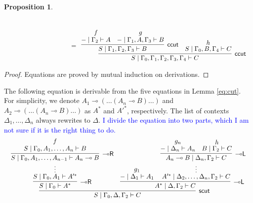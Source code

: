 \documentclass[sn-mathphys-num]{sn-jnl}%
\newcommand{\GG}{\Gamma}
\newcommand{\GD}{\Delta}
\newcommand{\vd}{\vdash}
\newcommand{\lolli}{\multimap}
\newcommand{\lleft}{{\lolli}\mathsf{L}}
\newcommand{\lright}{{\lolli}\mathsf{R}}
\newcommand{\mf}[1]{\mathsf{#1}}
\newcommand{\cheng}[1]{\textcolor{blue}{#1}}
\theoremstyle{thmstyleone}%
\newtheorem{proposition}[theorem]{Proposition}%
\theoremstyle{thmstyletwo}%
\theoremstyle{thmstylethree}%
\begin{document}
\begin{proposition}
\begin{displaymath}
\begin{array}{l}
      \\[10pt]
      \qquad \qquad \qquad \qquad \qquad  =
      \begin{array}{c}
        \infer[\mf{ccut}]{S \mid \GG_0 , \GG_1 , \GG_2 , \GG_3 , \GG_4 \vd C}{
          \infer[\mf{ccut}]{S \mid \GG_1 , \GG_2 , \GG_3 \vd B}{
            \deduce{{-} \mid \GG_2 \vd A}{f}
            &
            \deduce{{-} \mid \GG_1 , A , \GG_3 \vd B}{g}
          }
          &
          \deduce{S \mid \GG_0 , B , \GG_4 \vd C}{h}
        }
      \end{array}
    \end{array}
   \end{displaymath}
\end{proposition}
\begin{proof}
  Equations are proved by mutual induction on derivations.
\end{proof}
The following equation is derivable from the five equations in Lemma \ref{eq:cut}.
For simplicity, we denote $A_1 \lolli (\dots (A_n \lolli B) \dots)$ and $A_2 \lolli (\dots (A_n \lolli B) \dots)$ as $A^*$ and $A'^{*}$, respectively.
The list of contexts $\GD_1, \dots, \GD_n$ always rewrites to $\GD$.
\cheng{I divide the equation into two parts, which I am not sure if it is the right thing to do.}
  \begin{equation*}
   \begin{array}{l}
      \begin{array}{c}
        \infer[\mf{scut}]{S \mid \GG_0 , \GD , \GG_2 \vd C}{
      \infer[\lright]{S \mid \GG_0 \vd A^*}{
      \deduce{S \mid \GG_0 , A_1 \vd A'^*}{
        \deduce{\vdots}{
        \infer[\lright]{S \mid \GG_0 , A_1, \dots ,A_{n-1} \vd A_n \lolli B}{
        \deduce{S \mid \GG_0 , A_1, \dots, A_n \vd B}{f}
      }
      }
      }
    }
      &
      \infer[\lleft]{A^* \mid \GD, \GG_2 \vd C}{
      \deduce{{-} \mid \GD_1 \vd A_1}{g_1}
      &
      \deduce{A'^* \mid \GD_2, \dots, \GD_n, \GG_2 \vd C}{
        \deduce{\vdots}{
          \infer[\lleft]{A_n \lolli B \mid \GD_n, \GG_2 \vd C}{
            \deduce{{-} \mid \GD_n \vd A_n}{g_n}
            &
            \deduce{B \mid \GG_2 \vd C}{h}
          }
        }
      }
    }
    }
      \end{array}
      \end{array}
      \end{equation*}
\end{document}
